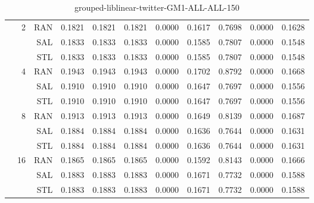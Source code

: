 \begin{center}
\begin{table}[htbp]
\begin{center}
\begin{tabular}{ | r | r | r | r | r | r | r | r | r | r | r |}
 & \multirow{3}{*}{2} & RAN & 0.1821 & 0.1821 & 0.1821 & 0.0000 & 0.1617 & 0.7698 & 0.0000 & 0.1628\\ \cline{3-11}
 &   & SAL & 0.1833 & 0.1833 & 0.1833 & 0.0000 & 0.1585 & 0.7807 & 0.0000 & 0.1548\\ \cline{3-11}
 &   & STL & 0.1833 & 0.1833 & 0.1833 & 0.0000 & 0.1585 & 0.7807 & 0.0000 & 0.1548\\ \cline{2-11}
 & \multirow{3}{*}{4} & RAN & 0.1943 & 0.1943 & 0.1943 & 0.0000 & 0.1702 & 0.8792 & 0.0000 & 0.1668\\ \cline{3-11}
 &   & SAL & 0.1910 & 0.1910 & 0.1910 & 0.0000 & 0.1647 & 0.7697 & 0.0000 & 0.1556\\ \cline{3-11}
 &   & STL & 0.1910 & 0.1910 & 0.1910 & 0.0000 & 0.1647 & 0.7697 & 0.0000 & 0.1556\\ \cline{2-11}
 & \multirow{3}{*}{8} & RAN & 0.1913 & 0.1913 & 0.1913 & 0.0000 & 0.1649 & 0.8139 & 0.0000 & 0.1687\\ \cline{3-11}
 &   & SAL & 0.1884 & 0.1884 & 0.1884 & 0.0000 & 0.1636 & 0.7644 & 0.0000 & 0.1631\\ \cline{3-11}
 &   & STL & 0.1884 & 0.1884 & 0.1884 & 0.0000 & 0.1636 & 0.7644 & 0.0000 & 0.1631\\ \cline{2-11}
 & \multirow{3}{*}{16} & RAN & 0.1865 & 0.1865 & 0.1865 & 0.0000 & 0.1592 & 0.8143 & 0.0000 & 0.1666\\ \cline{3-11}
 &   & SAL & 0.1883 & 0.1883 & 0.1883 & 0.0000 & 0.1671 & 0.7732 & 0.0000 & 0.1588\\ \cline{3-11}
 &   & STL & 0.1883 & 0.1883 & 0.1883 & 0.0000 & 0.1671 & 0.7732 & 0.0000 & 0.1588\\ \cline{2-11}
\hline
\end{tabular}
\caption{grouped-liblinear-twitter-GM1-ALL-ALL-150}
\end{center}
 \end{table}
\end{center}

